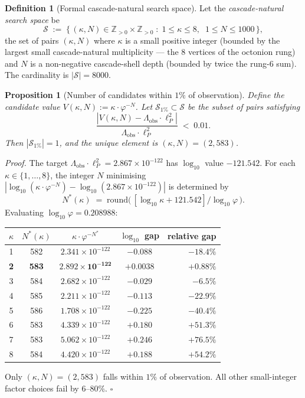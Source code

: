 \documentclass[11pt]{article}
\theoremstyle{plain}
\newtheorem{proposition}[theorem]{Proposition}
\theoremstyle{definition}
\newtheorem{definition}[theorem]{Definition}
\theoremstyle{remark}
\begin{document}
\begin{definition}[Formal cascade-natural search space]\label{def:search-space}
Let the \emph{cascade-natural search space} be
\[
  \mathcal{S} \;:=\; \bigl\{\, (\kappa, N) \in \mathbb{Z}_{>0} \times \mathbb{Z}_{>0} \;:\; 1 \le \kappa \le 8, \;\; 1 \le N \le 1000 \,\bigr\},
\]
the set of pairs $(\kappa, N)$ where $\kappa$ is a small positive integer (bounded by the largest small cascade-natural multiplicity --- the 8 vertices of the octonion rung) and $N$ is a non-negative cascade-shell depth (bounded by twice the rung-6 sum).
The cardinality is $|\mathcal{S}| = 8000$.
\end{definition}

\begin{proposition}[Number of candidates within $1\%$ of observation]\label{prop:search-count}
Define the candidate value $V(\kappa, N) := \kappa \cdot \varphi^{-N}$. Let $\mathcal{S}_{1\%} \subset \mathcal{S}$ be the subset of pairs satisfying
\[
  \frac{|V(\kappa, N) - \Lambda_\mathrm{obs} \cdot \ell_P^2|}{\Lambda_\mathrm{obs} \cdot \ell_P^2} \;<\; 0.01.
\]
Then $|\mathcal{S}_{1\%}| = 1$, and the unique element is $(\kappa, N) = (2, 583)$.
\end{proposition}

\noindent\emph{Proof.} The target $\Lambda_\mathrm{obs} \cdot \ell_P^2 = 2.867 \times 10^{-122}$ has $\log_{10}$ value $-121.542$. For each $\kappa \in \{1, \ldots, 8\}$, the integer $N$ minimising $|\log_{10}(\kappa \cdot \varphi^{-N}) - \log_{10}(2.867 \times 10^{-122})|$ is determined by
\[
  N^*(\kappa) \;=\; \mathrm{round}\bigl(\, [\log_{10}\kappa + 121.542] / \log_{10}\varphi \,\bigr).
\]
Evaluating $\log_{10}\varphi = 0.208988$:
\begin{center}
\begin{tabular}{ccccr}
\toprule
$\kappa$ & $N^*(\kappa)$ & $\kappa\cdot\varphi^{-N^*}$ & $\log_{10}$ gap & relative gap \\
\midrule
1 & 582 & $2.341 \times 10^{-122}$ & $-0.088$ & $-18.4\%$ \\
\textbf{2} & \textbf{583} & $\mathbf{2.892 \times 10^{-122}}$ & $\mathbf{+0.0038}$ & $\mathbf{+0.88\%}$ \\
3 & 584 & $2.682 \times 10^{-122}$ & $-0.029$ & $-6.5\%$ \\
4 & 585 & $2.211 \times 10^{-122}$ & $-0.113$ & $-22.9\%$ \\
5 & 586 & $1.708 \times 10^{-122}$ & $-0.225$ & $-40.4\%$ \\
6 & 583 & $4.339 \times 10^{-122}$ & $+0.180$ & $+51.3\%$ \\
7 & 583 & $5.062 \times 10^{-122}$ & $+0.246$ & $+76.5\%$ \\
8 & 584 & $4.420 \times 10^{-122}$ & $+0.188$ & $+54.2\%$ \\
\bottomrule
\end{tabular}
\end{center}
Only $(\kappa, N) = (2, 583)$ falls within $1\%$ of observation. All other small-integer factor choices fail by $6$--$80\%$. \hfill$\square$
\end{document}
